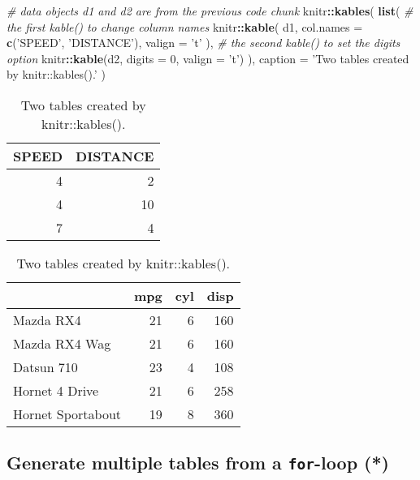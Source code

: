 \documentclass[
  11pt,
]{krantz}
\newenvironment{Shaded}{\begin{snugshade}}{\end{snugshade}}
\newcommand{\CommentTok}[1]{\textcolor[rgb]{0.37,0.37,0.37}{\textit{#1}}}
\newcommand{\DataTypeTok}[1]{\textcolor[rgb]{0.27,0.27,0.27}{#1}}
\newcommand{\DecValTok}[1]{\textcolor[rgb]{0.06,0.06,0.06}{#1}}
\newcommand{\KeywordTok}[1]{\textcolor[rgb]{0.27,0.27,0.27}{\textbf{#1}}}
\newcommand{\NormalTok}[1]{#1}
\newcommand{\OperatorTok}[1]{\textcolor[rgb]{0.43,0.43,0.43}{\textbf{#1}}}
\newcommand{\StringTok}[1]{\textcolor[rgb]{0.5,0.5,0.5}{#1}}
\begin{document}
\begin{Shaded}
\begin{Highlighting}[]
\CommentTok{# data objects d1 and d2 are from the previous code chunk}
\NormalTok{knitr}\OperatorTok{::}\KeywordTok{kables}\NormalTok{(}
  \KeywordTok{list}\NormalTok{(}
    \CommentTok{# the first kable() to change column names}
\NormalTok{    knitr}\OperatorTok{::}\KeywordTok{kable}\NormalTok{(}
\NormalTok{      d1, }\DataTypeTok{col.names =} \KeywordTok{c}\NormalTok{(}\StringTok{'SPEED'}\NormalTok{, }\StringTok{'DISTANCE'}\NormalTok{), }\DataTypeTok{valign =} \StringTok{'t'}
\NormalTok{    ),}
    \CommentTok{# the second kable() to set the digits option}
\NormalTok{    knitr}\OperatorTok{::}\KeywordTok{kable}\NormalTok{(d2, }\DataTypeTok{digits =} \DecValTok{0}\NormalTok{, }\DataTypeTok{valign =} \StringTok{'t'}\NormalTok{)}
\NormalTok{  ),}
  \DataTypeTok{caption =} \StringTok{'Two tables created by knitr::kables().'}
\NormalTok{)}
\end{Highlighting}
\end{Shaded}

\begin{table}
\caption{\label{tab:kables}Two tables created by knitr::kables().}

\begin{tabular}[t]{r|r}
\hline
SPEED & DISTANCE\\
\hline
4 & 2\\
\hline
4 & 10\\
\hline
7 & 4\\
\hline
\end{tabular}
\begin{tabular}[t]{l|r|r|r}
\hline
  & mpg & cyl & disp\\
\hline
Mazda RX4 & 21 & 6 & 160\\
\hline
Mazda RX4 Wag & 21 & 6 & 160\\
\hline
Datsun 710 & 23 & 4 & 108\\
\hline
Hornet 4 Drive & 21 & 6 & 258\\
\hline
Hornet Sportabout & 19 & 8 & 360\\
\hline
\end{tabular}
\end{table}

\hypertarget{generate-multiple-tables-from-a-for-loop}{%
\subsection{\texorpdfstring{Generate multiple tables from a \texttt{for}-loop (*)}{Generate multiple tables from a for-loop (*)}}\label{generate-multiple-tables-from-a-for-loop}}
\end{document}
